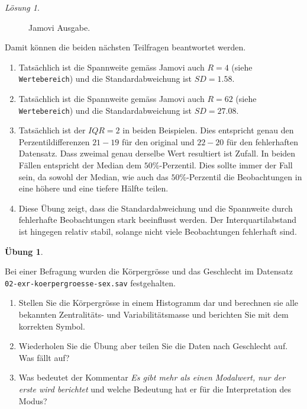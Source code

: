\documentclass[
]{book}
\providecommand{\tightlist}{%
  \setlength{\itemsep}{0pt}\setlength{\parskip}{0pt}}
\theoremstyle{definition}
\theoremstyle{definition}
\theoremstyle{definition}
\newtheorem{exercise}{Übung}[chapter]
\theoremstyle{definition}
\theoremstyle{remark}
\newtheorem*{solution}{Lösung}
\begin{document}
\begin{solution}
\begin{figure}
{}

\caption{Jamovi Ausgabe.}\label{fig:sol-theorie-variabilitaet-output}
\end{figure}

Damit können die beiden nächsten Teilfragen beantwortet werden.

\begin{enumerate}
\def\labelenumi{(\alph{enumi})}
\setcounter{enumi}{2}
\tightlist
\item
  Tatsächlich ist die Spannweite gemäss Jamovi auch \(R=4\) (siehe \texttt{Wertebereich}) und die Standardabweichung ist \(SD=1.58\).
\item
  Tatsächlich ist die Spannweite gemäss Jamovi auch \(R=62\) (siehe \texttt{Wertebereich}) und die Standardabweichung ist \(SD=27.08\).
\item
  Tatsächlich ist der \(IQR = 2\) in beiden Beispielen. Dies entspricht genau den Perzentildifferenzen \(21-19\) für den original und \(22-20\) für den fehlerhaften Datensatz. Dass zweimal genau derselbe Wert resultiert ist Zufall. In beiden Fällen entspricht der Median dem \(50\%\)-Perzentil. Dies sollte immer der Fall sein, da sowohl der Median, wie auch das \(50\%\)-Perzentil die Beobachtungen in eine höhere und eine tiefere Hälfte teilen.
\item
  Diese Übung zeigt, dass die Standardabweichung und die Spannweite durch fehlerhafte Beobachtungen stark beeinflusst werden. Der Interquartilabstand ist hingegen relativ stabil, solange nicht viele Beobachtungen fehlerhaft sind.
\end{enumerate}

\end{solution}

\begin{exercise}
\protect\hypertarget{exr:koerpergroesse}{}\label{exr:koerpergroesse}\leavevmode

Bei einer Befragung wurden die Körpergrösse und das Geschlecht im Datensatz \texttt{02-exr-koerpergroesse-sex.sav} festgehalten.

\begin{enumerate}
\def\labelenumi{(\alph{enumi})}
\tightlist
\item
  Stellen Sie die Körpergrösse in einem Histogramm dar und berechnen sie alle bekannten Zentralitäts- und Variabilitätsmasse und berichten Sie mit dem korrekten Symbol.
\item
  Wiederholen Sie die Übung aber teilen Sie die Daten nach Geschlecht auf. Was fällt auf?
\item
  Was bedeutet der Kommentar \emph{Es gibt mehr als einen Modalwert, nur der erste wird berichtet} und welche Bedeutung hat er für die Interpretation des Modus?
\end{enumerate}

\end{exercise}
\end{document}
